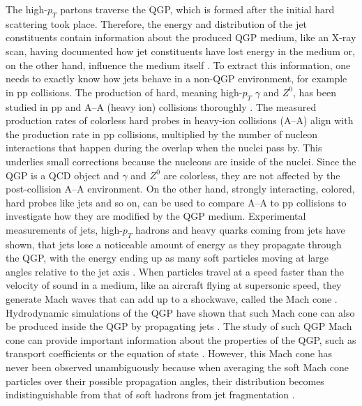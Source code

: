 \documentclass[
  a4paper,
  12pt,
  oneside,
  parskip=half,
  listof=totoc,
  bibliography=totoc,
  DIV=12,
  numbers=noenddot,
  BA.tex
  ]{subfiles}
\begin{document}
The high-$p_T$ partons traverse the QGP, which is formed after the initial hard scattering took place. Therefore, the energy and distribution of the jet constituents contain information about the produced QGP medium, like an X-ray scan, having documented how jet constituents have lost energy in the medium or, on the other hand, influence the medium itself \cite{busza_heavy_2018}. To extract this information, one needs to exactly know how jets behave in a non-QGP environment, for example in pp collisions. The production of hard, meaning high-$p_T$ $\gamma$ and $Z^0$, has been studied in pp and A--A (heavy ion) collisions thoroughly \cite{collaboration_measurement_2013} \cite{collaboration_study_2015} \cite{collaboration_centrality_2016}. The measured production rates of colorless hard probes in heavy-ion collisions (A--A) align with the production rate in pp collisions, multiplied by the number of nucleon interactions that happen during the overlap when the nuclei pass by. This underlies small corrections because the nucleons are inside of the nuclei. Since the QGP is a QCD object and $\gamma$ and $Z^0$ are colorless, they are not affected by the post-collision A--A environment. On the other hand, strongly interacting, colored, hard probes like jets and so on, can be used to compare A--A to pp collisions to investigate how they are modified by the QGP medium. Experimental measurements of jets, high-$p_T$ hadrons and heavy quarks coming from jets \cite{connors_review_2018} have shown, that jets lose a noticeable amount of energy as they propagate through the QGP, with the energy ending up as many soft particles moving at large angles relative to the jet axis \cite{collaboration_measurement_2016}. When particles travel at a speed faster than the velocity of sound in a medium, like an aircraft flying at supersonic speed, they generate Mach waves that can add up to a shockwave, called the Mach cone \cite{sasoh_compressible_2020}. Hydrodynamic simulations of the QGP have shown that such Mach cone can also be produced inside the QGP by propagating jets \cite{casalderrey-solana_conical_2005}. The study of such QGP Mach cone can provide important information about the properties of the QGP, such as transport coefficients or the equation of state \cite{yang_3d_2023}. However, this Mach cone has never been observed unambiguously because when averaging the soft Mach cone particles over their possible propagation angles, their distribution becomes indistinguishable from that of soft hadrons from jet fragmentation \cite{chen_effects_2018} \cite{chen_search_2021}.
\end{document}
